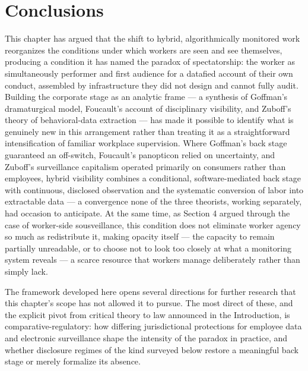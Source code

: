 \documentclass[10pt]{article}
\begin{document}
\section{Conclusions}

This chapter has argued that the shift to hybrid, algorithmically monitored work reorganizes the conditions under which workers are seen and see themselves, producing a condition it has named the paradox of spectatorship: the worker as simultaneously performer and first audience for a datafied account of their own conduct, assembled by infrastructure they did not design and cannot fully audit. Building the corporate stage as an analytic frame --- a synthesis of Goffman's dramaturgical model, Foucault's account of disciplinary visibility, and Zuboff's theory of behavioral-data extraction --- has made it possible to identify what is genuinely new in this arrangement rather than treating it as a straightforward intensification of familiar workplace supervision. Where Goffman's back stage guaranteed an off-switch, Foucault's panopticon relied on uncertainty, and Zuboff's surveillance capitalism operated primarily on consumers rather than employees, hybrid visibility combines a conditional, software-mediated back stage with continuous, disclosed observation and the systematic conversion of labor into extractable data --- a convergence none of the three theorists, working separately, had occasion to anticipate. At the same time, as Section 4 argued through the case of worker-side sousveillance, this condition does not eliminate worker agency so much as redistribute it, making opacity itself --- the capacity to remain partially unreadable, or to choose not to look too closely at what a monitoring system reveals --- a scarce resource that workers manage deliberately rather than simply lack.

The framework developed here opens several directions for further research that this chapter's scope has not allowed it to pursue. The most direct of these, and the explicit pivot from critical theory to law announced in the Introduction, is comparative-regulatory: how differing jurisdictional protections for employee data and electronic surveillance shape the intensity of the paradox in practice, and whether disclosure regimes of the kind surveyed below restore a meaningful back stage or merely formalize its absence.
\end{document}
